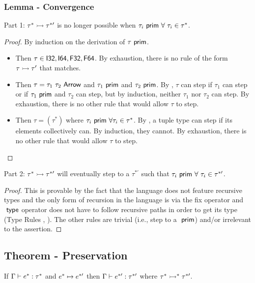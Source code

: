 \documentclass[acmsmall, review]{acmart}
\theoremstyle{definition}
\begin{document}
\subsubsection{Lemma - Convergence}%
Part 1: $\tau^* \rightarrowtail \tau^{*\prime}$ is no longer possible when $\tau_i ~\mathsf{prim} ~ \forall~ \tau_i \in \tau^*$.
\begin{proof}
By induction on the derivation of $\tau ~\mathsf{prim}$.

\begin{itemize}
    \item {}
        Then $\tau \in {\ensuremath{\mathsf{I32}}, \ensuremath{\mathsf{I64}}, \ensuremath{\mathsf{F32}}, \ensuremath{\mathsf{F64}}}$.
        By exhaustion, there is no rule of the form $\tau \rightarrowtail \tau'$ that matches.

    \item {}
        Then $\tau = \tau_1 ~ \tau_2 ~ \mathsf{Arrow}$ and $\tau_1 ~\mathsf{prim}$ and $\tau_2 ~\mathsf{prim}$.
        By , $\tau$ can step if $\tau_1$ can step or if $\tau_1 ~\mathsf{prim}$ and $\tau_2$ can step, but by induction, neither $\tau_1$ nor $\tau_2$ can step.
        By exhaustion, there is no other rule that would allow $\tau$ to step.

    \item {}
        Then $\tau = (\tau^*)$ where $\tau_i ~\mathsf{prim} ~ \forall \tau_i \in \tau^*$.
        By , a tuple type can step if its elements collectively can.
        By induction, they cannot.
        By exhaustion, there is no other rule that would allow $\tau$ to step.
\end{itemize}
\end{proof}
Part 2: $\tau^* \rightarrowtail \tau^{*\prime}$ will eventually step to a $\tau^{*\prime}$ such that $\tau_i ~\mathsf{prim} ~ \forall~ \tau_i \in \tau^{*\prime}$.
\begin{proof}
This is provable by the fact that the language does not feature recursive types and the only form of recursion in the language is via the fix operator and $~ \mathsf{type}$ operator does not have to follow recursive paths in order to get its type (Type Rules , ). The other rules are trivial (i.e., step to a $~\mathsf{prim}$) and/or irrelevant to the assertion.
\end{proof}


\subsection{Theorem - Preservation}
If $\Gamma \vdash e^* : \tau^*$ and $e^* \mapsto e^{*\prime}$ then $\Gamma \vdash e^{*\prime} : \tau^{*\prime}$ where $\tau^* \rightarrowtail^* \tau^{*\prime}$.
\end{document}
